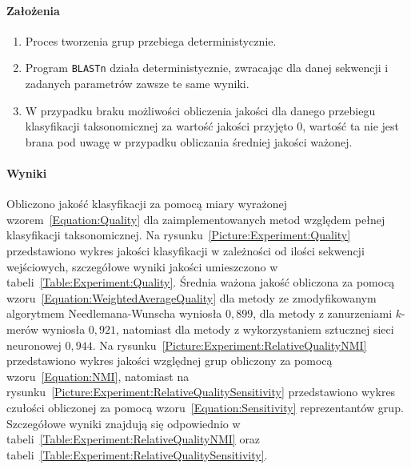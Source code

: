             \paragraph{Założenia}

                \begin{enumerate}
                    \item {
                        Proces tworzenia grup przebiega deterministycznie.
                    }
                    \item {
                        Program \texttt{BLASTn} działa deterministycznie, zwracając dla danej sekwencji i zadanych parametrów zawsze te same wyniki.
                    }
                    \item {
                        W przypadku braku możliwości obliczenia jakości dla danego przebiegu klasyfikacji taksonomicznej za wartość jakości przyjęto $0$, wartość ta nie jest brana pod uwagę w przypadku obliczania średniej jakości ważonej.
                    }
                \end{enumerate}

            \paragraph{Wyniki}
                Obliczono jakość klasyfikacji za pomocą miary wyrażonej wzorem~\ref{Equation:Quality} dla zaimplementowanych metod względem pełnej klasyfikacji taksonomicznej. Na rysunku~\ref{Picture:Experiment:Quality} przedstawiono wykres jakości klasyfikacji w zależności od ilości sekwencji wejściowych, szczegółowe wyniki jakości umieszczono w tabeli~\ref{Table:Experiment:Quality}. Średnia ważona jakość obliczona za pomocą wzoru~\ref{Equation:WeightedAverageQuality} dla metody ze zmodyfikowanym algorytmem Needlemana-Wunscha wyniosła $0,899$, dla metody z zanurzeniami $k$-merów wyniosła $0,921$, natomiast dla metody z wykorzystaniem sztucznej sieci neuronowej $0,944$. Na rysunku~\ref{Picture:Experiment:RelativeQualityNMI} przedstawiono wykres jakości względnej grup obliczony za pomocą wzoru~\ref{Equation:NMI}, natomiast na rysunku~\ref{Picture:Experiment:RelativeQualitySensitivity} przedstawiono wykres czułości obliczonej za pomocą wzoru~\ref{Equation:Sensitivity} reprezentantów grup. Szczegółowe wyniki znajdują się odpowiednio w tabeli~\ref{Table:Experiment:RelativeQualityNMI} oraz tabeli~\ref{Table:Experiment:RelativeQualitySensitivity}.

